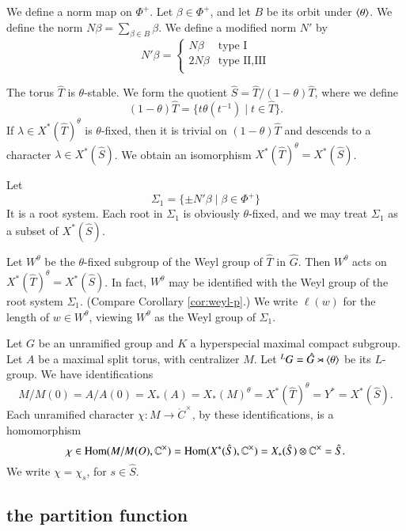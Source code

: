 We define a norm map on $\Phi^+$.  Let $\beta\in\Phi^+$, and let $B$ be its orbit under $\langle{\theta}\rangle$.
We define the norm $N\beta = \sum_{\beta\in B} \beta$. We define a modified norm $N'$ by
\[
N'\beta = \begin{cases} 
N\beta & \text{type I}\\
2N\beta & \text{type II,III}\\
\end{cases}
\]

The torus $\hat T$ is $\theta$-stable.  We form the quotient 
$\hat S = \hat T/(1-\theta) \hat T$, where we define
\[
(1-\theta)\hat T = \{ t\theta(t^{-1}) \mid t\in \hat T\}.
\]
If $\lambda\in X^*(\hat T)^\theta$ is $\theta$-fixed, then
it is trivial on $(1-\theta)\hat T$ and descends to a character $\lambda\in X^*(\hat S)$.
We obtain an isomorphism $X^*(\hat T)^\theta = X^*(\hat S)$.

Let 
\[
\Sigma_1 = \{\pm N'\beta\mid \beta\in \Phi^+\}
\]
It is a root system.  Each root in $\Sigma_1$ is obviously $\theta$-fixed, and we
may treat $\Sigma_1$ as a subset of  $X^*(\hat S)$.

Let $W^\theta$ be the $\theta$-fixed subgroup of the Weyl group of $\hat T$ in $\hat G$.  
  Then $W^\theta$ acts on $X^*(\hat T)^\theta = X^*(\hat S)$.  In fact, $W^\theta$ may be
identified with the Weyl group of the root system $\Sigma_1$. (Compare Corollary \ref{cor:weyl-p}.)
We write $\ell(w)$ for the length of $w\in W^\theta$, viewing $W^\theta$ as the Weyl group of $\Sigma_1$.

Let $G$ be an unramified group and $K$ a hyperspecial maximal compact subgroup.  Let $A$ be a maximal split torus,
with centralizer $M$.  Let ${}^LG = \hat G \rtimes \langle{\theta}\rangle$ be its $L$-group.
We have identifications
\begin{equation}\label{eqn:identify}
M/M(0)=A/A(0)=X_*(A)=X_*(M)^\theta  =X^*(\hat T)^\theta = Y^* = X^*(\hat S).
\end{equation}
Each unramified character $\chi:M\to \ring{C}^\times$, by these identifications, is a homomorphism
\[
\chi\in{\operatorname{Hom}}(M/M(O),\mathbb{C}^\times) = {\operatorname{Hom}}(X^*(\hat S),\mathbb{C}^\times) = X_*(\hat S)\otimes \mathbb{C}^\times = \hat S.
\]
We write $\chi = \chi_s$, for $s\in\hat S$.





\subsection{the partition function}


